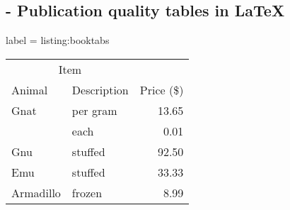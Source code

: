 
\subsection{ - Publication quality tables in LaTeX}

\begin{tcblisting}{label = listing:booktabs}
  \begin{tabular}{@{}llr@{}} \toprule
    \multicolumn{2}{c}{Item}              \\ \cmidrule(r){1-2}
    Animal    & Description  & Price (\$) \\ \midrule
    Gnat      & per gram     & 13.65      \\
              & each         & 0.01       \\
    Gnu       & stuffed      & 92.50      \\
    Emu       & stuffed      & 33.33      \\
    Armadillo & frozen       & 8.99       \\ \bottomrule
  \end{tabular}
\end{tcblisting}
